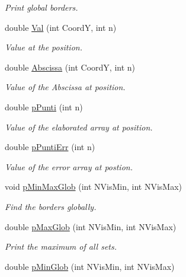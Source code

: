 \begin{DoxyCompactItemize}
\begin{DoxyCompactList}\small\item\em \-Print global borders. \end{DoxyCompactList}\item 
double \hyperlink{classVarDatFile_a2b1e58fd6ed28920042681b8e27f369f}{\-Val} (int \-Coord\-Y, int n)
\begin{DoxyCompactList}\small\item\em \-Value at the position. \end{DoxyCompactList}\item 
double \hyperlink{classVarDatFile_a3f23e3592344b829371e42e77ed02d15}{\-Abscissa} (int \-Coord\-Y, int n)
\begin{DoxyCompactList}\small\item\em \-Value of the \-Abscissa at position. \end{DoxyCompactList}\item 
double \hyperlink{classVarDatFile_aceb09b397fee83699a8b810fcaa02d26}{p\-Punti} (int n)
\begin{DoxyCompactList}\small\item\em \-Value of the elaborated array at position. \end{DoxyCompactList}\item 
double \hyperlink{classVarDatFile_a3a14794e0583788d1cd614bfa4aa4a17}{p\-Punti\-Err} (int n)
\begin{DoxyCompactList}\small\item\em \-Value of the error array at postion. \end{DoxyCompactList}\item 
\hypertarget{classVarDatFile_a46c8b0d765845804061b9ed216e96555}{void \hyperlink{classVarDatFile_a46c8b0d765845804061b9ed216e96555}{p\-Min\-Max\-Glob} (int \-N\-Vis\-Min, int \-N\-Vis\-Max)}\label{classVarDatFile_a46c8b0d765845804061b9ed216e96555}

\begin{DoxyCompactList}\small\item\em \-Find the borders globally. \end{DoxyCompactList}\item 
\hypertarget{classVarDatFile_a3842ee06d27e5ffab8330b9a42abe651}{double \hyperlink{classVarDatFile_a3842ee06d27e5ffab8330b9a42abe651}{p\-Max\-Glob} (int \-N\-Vis\-Min, int \-N\-Vis\-Max)}\label{classVarDatFile_a3842ee06d27e5ffab8330b9a42abe651}

\begin{DoxyCompactList}\small\item\em \-Print the maximum of all sets. \end{DoxyCompactList}\item 
\hypertarget{classVarDatFile_abb5cfc85ebb62f7226afe58ab7f70f68}{double \hyperlink{classVarDatFile_abb5cfc85ebb62f7226afe58ab7f70f68}{p\-Min\-Glob} (int \-N\-Vis\-Min, int \-N\-Vis\-Max)}\label{classVarDatFile_abb5cfc85ebb62f7226afe58ab7f70f68}


\end{DoxyCompactItemize}
